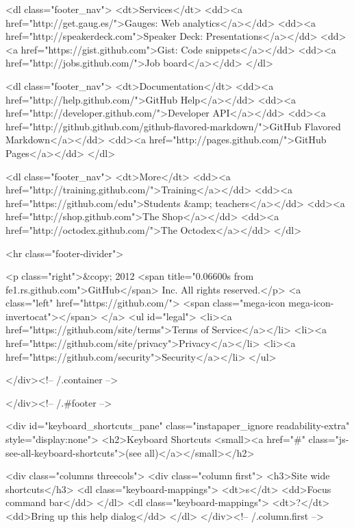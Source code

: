       <dl class="footer_nav">
        <dt>Services</dt>
        <dd><a href="http://get.gaug.es/">Gauges: Web analytics</a></dd>
        <dd><a href="http://speakerdeck.com">Speaker Deck: Presentations</a></dd>
        <dd><a href="https://gist.github.com">Gist: Code snippets</a></dd>
        <dd><a href="http://jobs.github.com/">Job board</a></dd>
      </dl>

      <dl class="footer_nav">
        <dt>Documentation</dt>
        <dd><a href="http://help.github.com/">GitHub Help</a></dd>
        <dd><a href="http://developer.github.com/">Developer API</a></dd>
        <dd><a href="http://github.github.com/github-flavored-markdown/">GitHub Flavored Markdown</a></dd>
        <dd><a href="http://pages.github.com/">GitHub Pages</a></dd>
      </dl>

      <dl class="footer_nav">
        <dt>More</dt>
        <dd><a href="http://training.github.com/">Training</a></dd>
        <dd><a href="https://github.com/edu">Students &amp; teachers</a></dd>
        <dd><a href="http://shop.github.com">The Shop</a></dd>
        <dd><a href="http://octodex.github.com/">The Octodex</a></dd>
      </dl>

      <hr class="footer-divider">


    <p class="right">&copy; 2012 <span title="0.06600s from fe1.rs.github.com">GitHub</span> Inc. All rights reserved.</p>
    <a class="left" href="https://github.com/">
      <span class="mega-icon mega-icon-invertocat"></span>
    </a>
    <ul id="legal">
        <li><a href="https://github.com/site/terms">Terms of Service</a></li>
        <li><a href="https://github.com/site/privacy">Privacy</a></li>
        <li><a href="https://github.com/security">Security</a></li>
    </ul>

  </div><!-- /.container -->

</div><!-- /.#footer -->


    

<div id="keyboard_shortcuts_pane" class="instapaper_ignore readability-extra" style="display:none">
  <h2>Keyboard Shortcuts <small><a href="#" class="js-see-all-keyboard-shortcuts">(see all)</a></small></h2>

  <div class="columns threecols">
    <div class="column first">
      <h3>Site wide shortcuts</h3>
      <dl class="keyboard-mappings">
        <dt>s</dt>
        <dd>Focus command bar</dd>
      </dl>
      <dl class="keyboard-mappings">
        <dt>?</dt>
        <dd>Bring up this help dialog</dd>
      </dl>
    </div><!-- /.column.first -->

